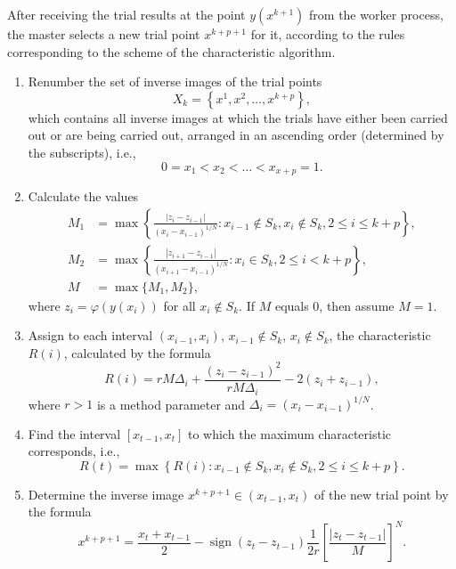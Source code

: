 \documentclass{svproc}
\begin{document}
After receiving the trial results at the point $y(x^{k+1})$ from the worker process, the master selects a new trial point $x^{k+p+1}$ for it, according to the rules corresponding to the scheme of the characteristic algorithm.
\begin{enumerate}
	\item
Renumber the set of inverse images of the trial points
\[
X_k = \left\{x^1, x^2,\ldots,x^{k+p} \right\},
\]
which contains all inverse images at which the trials have either been carried out or are being carried out, arranged in an ascending order (determined by the subscripts), i.e.,
\[
0=x_1<x_2<\ldots<x_{x+p}=1.
\]

	\item
Calculate the values
\[
\begin{aligned}
M_1&=\max \left\{ \frac{ \left|z_i - z_{i-1} \right|}{(x_i-x_{i-1})^{1/N}} : x_{i-1} \notin S_k, x_i \notin S_k, 2\leq i\leq k+p \right\},\\
M_2&=\max \left\{ \frac{ \left|z_{i+1} - z_{i-1} \right|}{(x_{i+1}-x_{i-1})^{1/N}} : x_i \in S_k, 2\leq i < k+p \right\},\\
M&=\max\{M_1,M_2\},
\end{aligned}
\]
where $z_i=\varphi(y(x_i))$ for all $x_i \notin S_k$.
If $M$ equals 0, then assume $M=1$.

	\item
Assign to each interval $(x_{i-1},x_i)$, $x_{i-1} \notin S_k$, $x_i \notin S_k$, the characteristic $R(i)$, calculated by the formula
\begin{equation} \label{R}
R(i)=rM\Delta_i+\frac{(z_i-z_{i-1})^2}{rM\Delta_i}-2(z_i+z_{i-1}),
\end{equation}
where $r>1$ is a method parameter and $\Delta_i=\left(x_i-x_{i-1}\right)^{1/N}$.

	\item
Find the interval $[x_{t-1},x_t]$ to which the maximum characteristic corresponds, i.e.,
\[
R(t) = \max \left\{ R(i) : x_{i-1} \notin S_k, x_i \notin S_k, 2\leq i\leq k+p \right\}.
\]

	\item
Determine the inverse image $x^{k+p+1} \in (x_{t-1},x_t)$ of the new trial point by the formula
\[
x^{k+p+1} = \frac{x_{t}+x_{t-1}}{2} - \operatorname{sign}(z_{t}-z_{t-1})\frac{1}{2r}\left[\frac{\left|z_{t}-z_{t-1}\right|}{M}\right]^N.
\]
\end{enumerate}
\end{document}
